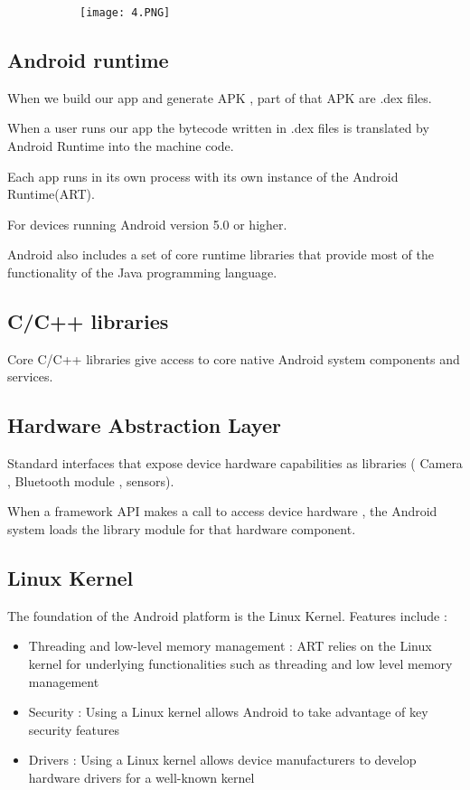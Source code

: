 \documentclass{article}
\begin{document}
\begin{figure}[ht!]
  \centering
  \begin{subfigure}[b]{0.6\linewidth}
    \texttt{[image: 4.PNG]}
  \end{subfigure}
\end{figure}

\subsection{Android runtime}

When we build our app and generate APK , part of that APK are .dex files.

When a user runs our app the bytecode written in .dex files is translated by Android Runtime into the machine code.

Each app runs in its own process with its own instance of the Android Runtime(ART).

For devices running Android version 5.0 or higher.

Android also includes a set of core runtime libraries that provide most of the functionality of the Java programming language. 

\subsection{C/C++ libraries}

Core C/C++ libraries give access to core native Android system components and services.

\subsection{Hardware Abstraction Layer}

Standard interfaces that expose device hardware capabilities as libraries ( Camera , Bluetooth module , sensors).

When a framework API makes a call to access device hardware , the Android system loads the library module for that hardware component.

\subsection{Linux Kernel}

The foundation of the Android platform is the Linux Kernel. Features include :

\begin{itemize}
    \item Threading and low-level memory management : ART relies on the Linux kernel for underlying functionalities such as threading and low level memory management
    \item Security : Using a Linux kernel allows Android to take advantage of key security features
    \item Drivers : Using a Linux kernel allows device manufacturers to develop hardware drivers for a well-known kernel
\end{itemize}
\end{document}
